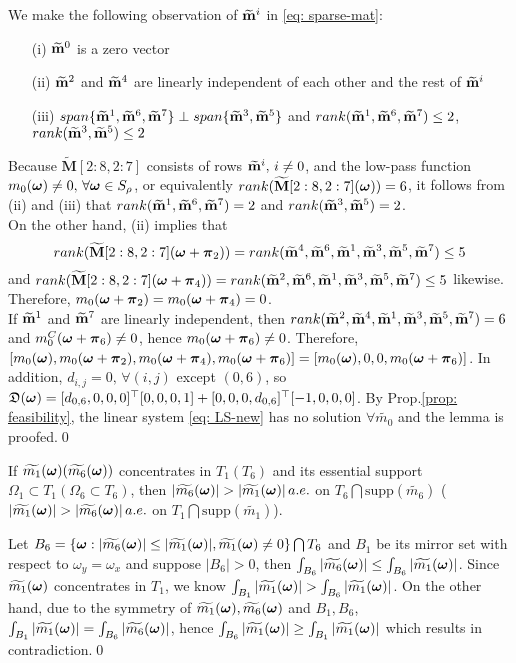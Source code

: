 We make the following observation of $\mrow{i}$ in \eqref{eq: sparse-mat}:
\begin{itemize}
\item[(i)] $\mrow{0}$ is a zero vector
\item[(ii)] $\mrow{2}$ and $\mrow{4}$ are linearly independent of each other and the rest of $\mrow{i}$
\item[(iii)] $span\{\mrow{1},\mrow{6},\mrow{7}\} \perp span\{\mrow{3},\mrow{5}\}$ and $rank(\mrow{1},\mrow{6},\mrow{7}) \leq 2$, $rank(\mrow{3},\mrow{5})\leq 2$
\end{itemize}
Because $\widetilde{\mathbf{M}}[2:8,2:7]$ consists of rows $\mrow{i},\,i\neq 0$, and the low-pass function $m_0(\V{\omega})\neq 0,\, \forall\V{\omega}\in S_\rho$, or equivalently $rank(\widetilde{\mathbf{M}}[2:8,2:7](\V{\omega})) = 6$, it follows from  (ii) and (iii) that $rank(\mrow{1},\mrow{6},\mrow{7}) = 2$ and $rank(\mrow{3},\mrow{5})= 2$.\\
On the other hand, (ii) implies that $$rank(\widetilde{\mathbf{M}}[2:8,2:7](\V{\omega}+\V{\pi}_2))=rank(\mrow{4},\mrow{6},\mrow{1},\mrow{3},\mrow{5},\mrow{7})\leq 5$$ and $rank(\widetilde{\mathbf{M}}[2:8,2:7](\V{\omega}+\V{\pi}_4))=rank(\mrow{2},\mrow{6},\mrow{1},\mrow{3},\mrow{5},\mrow{7})\leq 5$ likewise. Therefore, $m_0(\V{\omega}+\V{\pi}_2) = m_0(\V{\omega}+\V{\pi}_4) = 0$.\\
If $\mrow{1}$ and $\mrow{7}$ are linearly independent, then $rank(\mrow{2},\mrow{4},\mrow{1},\mrow{3},\mrow{5},\mrow{7}) = 6$ and $m_0^C(\V{\omega}+\V{\pi}_6)\neq 0$, hence $m_0(\V{\omega}+\V{\pi}_6)\neq 0$. Therefore, $[m_0(\V{\omega}),m_0(\V{\omega}+\V{\pi}_2),m_0(\V{\omega}+\V{\pi}_4),m_0(\V{\omega}+\V{\pi}_6)] = [m_0(\V{\omega}),0,0,m_0(\V{\omega}+\V{\pi}_6)]$. In addition, $d_{i,j} = 0,\, \forall(i,j)$ except $(0,6)$, so $\mathfrak{D}(\V{\omega}) = [d_{0,6}, 0, 0,0]^\top [0,0,0,1] + [0,0,0,d_{0,6}]^\top [-1,0,0,0]$.  By Prop.\ref{prop: feasibility}, the linear system \eqref{eq: LS-new} has no solution $\forall \widetilde{m_0}$ and the lemma is proofed.\qed
\begin{lemma}\label{lem: concentrate}
If $\m{1} (\m{6})$ concentrates in $T_1 (T_6)$ and its essential support $\Omega_1\subset T_1 (\Omega_6\subset T_6)$, then $|\m{6}| > |\m{1}|\, a.e.$ on $T_6\bigcap \text{supp}(\widetilde{m_6})$ ($|\m{1}| > |\m{6}|\,a.e.$ on $T_1\bigcap\text{supp}(\widetilde{m_1})$).
\end{lemma}
Let $B_6=\{\V{\omega}: |\m{6}| \leq |\m{1}|, \m{1}\neq 0\}\bigcap T_6$ and $B_1$ be its mirror set with respect to $\omega_y = \omega_x$ and suppose $|B_6|>0$, then $\int_{B_6}|\m{6}|\leq \int_{B_6}|\m{1}|$. Since $\m{1}$ concentrates in $T_1$, we know $\int_{B_1}|\m{1}| > \int_{B_6}|\m{1}|$. On the other hand, due to the symmetry of $\m{1},\m{6}$ and $B_1,B_6$, $\int_{B_1}|\m{1}| = \int_{B_6}|\m{6}|$, hence $\int_{B_6}|\m{1}| \geq \int_{B_1}|\m{1}| $ which results in contradiction.\qed


